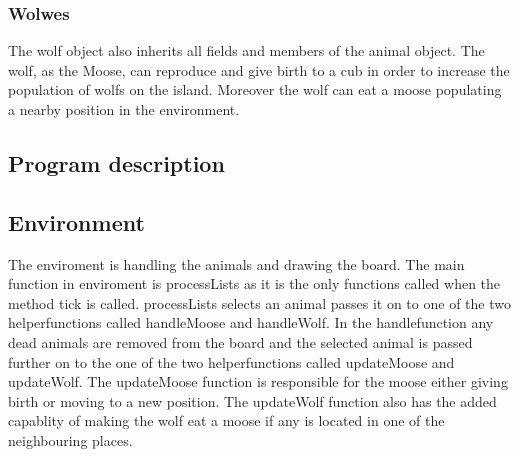 \documentclass[a4paper]{report}
\begin{document}
\subsubsection*{Wolwes}
The wolf object also inherits all fields and members of the animal object. The wolf, as the Moose, can reproduce and give birth to a cub in order to increase the population of wolfs on the island. Moreover the wolf can eat a moose populating a nearby position in the environment. 







\subsection*{Program description}

\subsection*{Environment}
The enviroment is handling the animals and drawing the board. The main function in enviroment is processLists as it is the only functions called when the method tick is called.
processLists selects an animal passes it on to one of the two helperfunctions called handleMoose and handleWolf. In the handlefunction any dead animals are removed from the board and the selected animal
is passed further on to the one of the two helperfunctions called updateMoose and updateWolf. The updateMoose function is responsible for the moose either giving birth or moving to a new position.
The updateWolf function also has the added capablity of making the wolf eat a moose if any is located in one of the neighbouring places.
\end{document}
